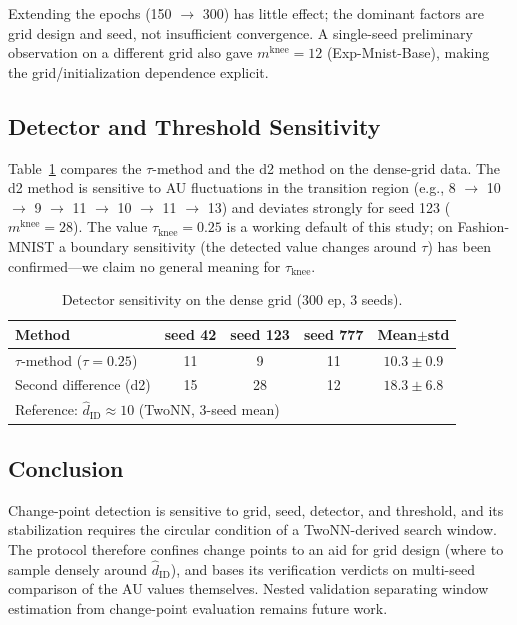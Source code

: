 \documentclass[make,article,submit,pdftex,moreauthors]{Definitions/mdpi}
\newcommand{\hatdID}{\hat{d}_{\mathrm{ID}}}
\newcommand{\mknee}{m^{\mathrm{knee}}}
\begin{document}
Extending the epochs (150 $\to$ 300) has little effect; the dominant factors
are grid design and seed, not insufficient convergence.
A single-seed preliminary observation on a different grid also gave
$\mknee = 12$ (Exp-Mnist-Base), making the grid/initialization dependence
explicit.

\subsection[\appendixname~\thesubsection]{Detector and Threshold Sensitivity}

Table~\ref{tab:knee_method} compares the $\tau$-method and the d2 method on
the dense-grid data.
The d2 method is sensitive to AU fluctuations in the transition region
(e.g., 8 $\to$ 10 $\to$ 9 $\to$ 11 $\to$ 10 $\to$ 11 $\to$ 13) and deviates
strongly for seed 123 ($\mknee = 28$).
The value $\tau_{\mathrm{knee}} = 0.25$ is a working default of this study;
on Fashion-MNIST a boundary sensitivity (the detected value changes around
$\tau$) has been confirmed---we claim no general meaning for
$\tau_{\mathrm{knee}}$.

\begin{table}[H]
\caption{Detector sensitivity on the dense grid (300 ep, 3 seeds).}
\label{tab:knee_method}
\small
\begin{tabular}{lcccc}
\toprule
\textbf{Method} & \textbf{seed 42} & \textbf{seed 123} & \textbf{seed 777} & \textbf{Mean$\pm$std} \\
\midrule
$\tau$-method ($\tau = 0.25$) & 11 & 9 & 11 & $10.3 \pm 0.9$ \\
Second difference (d2) & 15 & 28 & 12 & $18.3 \pm 6.8$ \\
\midrule
\multicolumn{5}{l}{Reference: $\hatdID \approx 10$ (TwoNN, 3-seed mean)} \\
\bottomrule
\end{tabular}
\end{table}

\subsection[\appendixname~\thesubsection]{Conclusion}

Change-point detection is sensitive to grid, seed, detector, and threshold,
and its stabilization requires the circular condition of a TwoNN-derived
search window.
The protocol therefore confines change points to an aid for grid design
(where to sample densely around $\hatdID$), and bases its verification
verdicts on multi-seed comparison of the AU values themselves.
Nested validation separating window estimation from change-point evaluation
remains future work.
\end{document}
